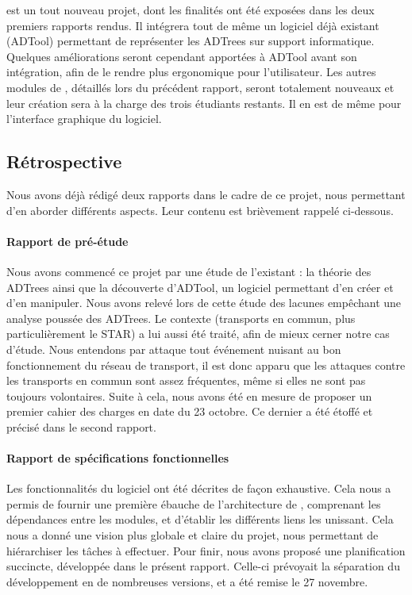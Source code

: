 	\glasir{} est un tout nouveau projet, dont les finalités ont été exposées dans les deux premiers rapports rendus. Il intégrera tout de même un logiciel déjà existant (ADTool) permettant de représenter les ADTrees sur support informatique. Quelques améliorations seront cependant apportées à ADTool avant son intégration, afin de le rendre plus ergonomique pour l'utilisateur. Les autres modules de \glasir{}, détaillés lors du précédent rapport, seront totalement nouveaux et leur création sera à la charge des trois étudiants restants. Il en est de même pour l'interface graphique du logiciel.

	\subsection{Rétrospective}

	Nous avons déjà rédigé deux rapports dans le cadre de ce projet, nous permettant d'en aborder différents aspects. Leur contenu est brièvement rappelé ci-dessous.

	\paragraph{Rapport de pré-étude} Nous avons commencé ce projet par une étude de l'existant : la théorie des ADTrees ainsi que la découverte d'ADTool, un logiciel permettant d'en créer et d'en manipuler. Nous avons relevé lors de cette étude des lacunes empêchant une analyse poussée des ADTrees. Le contexte (transports en commun, plus particulièrement le STAR) a lui aussi été traité, afin de mieux cerner notre cas d'étude. Nous entendons par \og attaque \fg{} tout événement nuisant au bon fonctionnement du réseau de transport, il est donc apparu que les attaques contre les transports en commun sont assez fréquentes, même si elles ne sont pas toujours volontaires. Suite à cela, nous avons été en mesure de proposer un premier cahier des charges en date du 23 octobre. Ce dernier a été étoffé et précisé dans le second rapport.

	\paragraph{Rapport de spécifications fonctionnelles} Les fonctionnalités du logiciel ont été décrites de façon exhaustive. Cela nous a permis de fournir une première ébauche de l'architecture de \glasir{}, comprenant les dépendances entre les modules, et d'établir les différents liens les unissant. Cela nous a donné une vision plus globale et claire du projet, nous permettant de hiérarchiser les tâches à effectuer. Pour finir, nous avons proposé une planification succincte, développée dans le présent rapport. Celle-ci prévoyait la séparation du développement en de nombreuses versions, et a été remise le 27 novembre.

